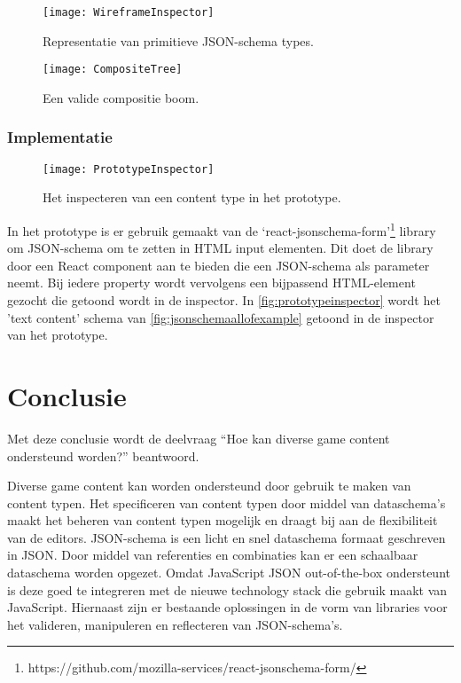 \begin{figure}[H]
    \centering
    \begin{minipage}{.5\textwidth}
        \centering
        \texttt{[image: WireframeInspector]}
        \caption{Representatie van primitieve JSON-schema types.}
        \label{fig:representationschematypes}    
    \end{minipage}%
    \begin{minipage}{.5\textwidth}
        \centering
        \texttt{[image: CompositeTree]}
        \caption{Een valide compositie boom.}
        \label{fig:compositetree}
    \end{minipage}
\end{figure}

\subsubsection{Implementatie}
\begin{wrapfigure}{r}{0.42\textwidth}
    \texttt{[image: PrototypeInspector]}
    \caption{Het inspecteren van een content type in het prototype.}
    \label{fig:prototypeinspector}
    \centering
\end{wrapfigure}

In het prototype is er gebruik gemaakt van de ‘react-jsonschema-form’\footnote{https://github.com/mozilla-services/react-jsonschema-form/} library om JSON-schema om te zetten in HTML input elementen. Dit doet de library door een React component aan te bieden die een JSON-schema als parameter neemt. Bij iedere property wordt vervolgens een bijpassend HTML-element gezocht die getoond wordt in de inspector. In \autoref{fig:prototypeinspector} wordt het 'text content' schema van \autoref{fig:jsonschemaallofexample} getoond in de inspector van het prototype.

\pagebreak

\section{Conclusie}
Met deze conclusie wordt de deelvraag “Hoe kan diverse game content ondersteund worden?” beantwoord.

Diverse game content kan worden ondersteund door gebruik te maken van content typen. Het specificeren van content typen door middel van dataschema’s maakt het beheren van content typen mogelijk en draagt bij aan de flexibiliteit van de editors. JSON-schema is een licht en snel dataschema formaat geschreven in JSON. Door middel van referenties en combinaties kan er een schaalbaar dataschema worden opgezet. Omdat JavaScript JSON out-of-the-box ondersteunt is deze goed te integreren met de nieuwe technology stack die gebruik maakt van JavaScript. Hiernaast zijn er bestaande oplossingen in de vorm van libraries voor het valideren, manipuleren en reflecteren van JSON-schema’s.

